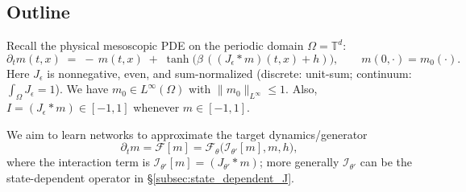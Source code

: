 \documentclass[11pt,a4paper]{article}
\theoremstyle{plain}
\theoremstyle{definition}
\theoremstyle{remark}
\begin{document}
\subsection{Outline}


Recall the physical mesoscopic PDE on the periodic domain $\Omega=\mathbb{T}^d$:
\[
	\partial_t m(t,x) \;=\; -\,m(t,x)\; +\; \tanh\!\big(\beta\,((J_\epsilon * m)(t,x) + h)\big),
	\qquad m(0,\cdot)=m_0(\cdot).
\]
Here $J_\epsilon$ is nonnegative, even, and sum-normalized (discrete: unit-sum; continuum: $\int_\Omega J_\epsilon=1$). We have $m_0\in L^\infty(\Omega)$ with $\|m_0\|_{L^\infty}\le 1$. Also, $I = (J_\epsilon * m) \in [-1,1]$ whenever $m\in [-1,1]$.







We aim to learn networks to approximate the target dynamics/generator
$$
	\partial_t m = \mathcal{F}[m] = \mathcal{F}_\theta\big(\mathcal{I}_{\theta\prime}[m], m, h \big),
$$
where the interaction term is $\mathcal{I}_{\theta\prime}[m]=(J_{\theta\prime}*m)$; more generally $\mathcal{I}_{\theta\prime}$ can be the state-dependent operator in \S\ref{subsec:state_dependent_J}.
\end{document}
